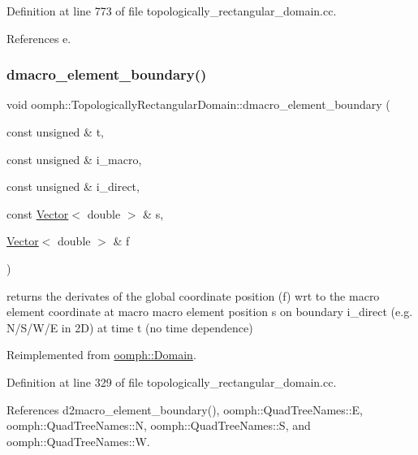 Definition at line 773 of file topologically\+\_\+rectangular\+\_\+domain.\+cc.



References e.

\mbox{\label{classoomph_1_1TopologicallyRectangularDomain_a218b22a016e2f330d6b90354597d9786}} 
\subsubsection{\texorpdfstring{dmacro\+\_\+element\+\_\+boundary()}{dmacro\_element\_boundary()}}
{\footnotesize\ttfamily void oomph\+::\+Topologically\+Rectangular\+Domain\+::dmacro\+\_\+element\+\_\+boundary (\begin{DoxyParamCaption}\item[{const unsigned \&}]{t,  }\item[{const unsigned \&}]{i\+\_\+macro,  }\item[{const unsigned \&}]{i\+\_\+direct,  }\item[{const \hyperlink{classoomph_1_1Vector}{Vector}$<$ double $>$ \&}]{s,  }\item[{\hyperlink{classoomph_1_1Vector}{Vector}$<$ double $>$ \&}]{f }\end{DoxyParamCaption})\hspace{0.3cm}{\ttfamily [virtual]}}

returns the derivates of the global coordinate position (f) wrt to the macro element coordinate at macro macro element position s on boundary i\+\_\+direct (e.\+g. N/\+S/\+W/E in 2D) at time t (no time dependence) 

Reimplemented from \hyperlink{classoomph_1_1Domain_ae573c54363a8e9d33951e59208a9bc39}{oomph\+::\+Domain}.



Definition at line 329 of file topologically\+\_\+rectangular\+\_\+domain.\+cc.



References d2macro\+\_\+element\+\_\+boundary(), oomph\+::\+Quad\+Tree\+Names\+::E, oomph\+::\+Quad\+Tree\+Names\+::N, oomph\+::\+Quad\+Tree\+Names\+::S, and oomph\+::\+Quad\+Tree\+Names\+::W.



